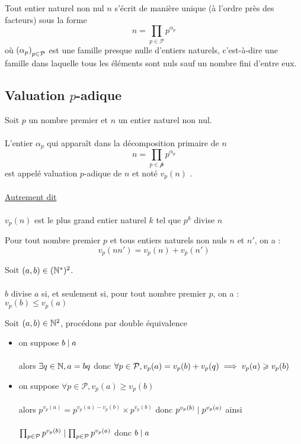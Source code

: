 \begin{defprop}[Corrolaire]
	Tout entier naturel non nul \(n\) s’écrit de manière unique (à l’ordre près des facteurs) sous la forme
	\[n = \prod_{p \in \mathcal{P}}p^{\alpha_p}\]
	où \(\left(\alpha_p\right)_{p \in \mathcal{P}}\) est une famille presque nulle d’entiers naturels, c’est-à-dire une famille dans laquelle tous les éléments sont nuls sauf un nombre fini d’entre eux.
\end{defprop}

\subsection{Valuation \(p\)-adique}
\begin{defprop}
	Soit \(p\) un nombre premier et \(n\) un entier naturel non nul.\\~\\
	L’entier \(\alpha_p\) qui apparaît dans la décomposition primaire de \(n\)
	\[n = \prod_{p \in \mathcal{p}} p ^{\alpha_p}\]
	est appelé valuation \(p\)-adique de \(n\) et noté \(v_p(n)\) .\\~\\
	\underline{Autrement dit}\\~\\
	\(v_p(n)\) est le plus grand entier naturel \(k\) tel que \(p^k\) divise \(n\)
\end{defprop}

\begin{defprop}
	Pour tout nombre premier \(p\) et tous entiers naturels non nuls \(n\) et \(n'\), on a :
	\[v_p(nn') = v_p(n) + v_p(n')\]
\end{defprop}

\begin{defprop}
	Soit \((a, b) \in (\mathbb{N}^*)^2\).\\~\\
	\(b\) divise \(a\) si, et seulement si, pour tout nombre premier \(p\), on a : \(v_p(b) \leq v_p(a)\)
\end{defprop}

\begin{dem}
	Soit \((a,b) \in \mathbb{N}^2\), procédons par double équivalence
	\begin{itemize}
		\item \impdir on suppose \(b\mid a\)\\~\\
		      alors \(\exists q \in \mathbb{N}, a = bq\) donc \(\forall p \in \mathcal{P}, v_p(a) = v_p(b) + v_p(q) \implies v_p(a) \geqslant v_p(b)\)
		\item \imprec on suppose \(\forall p \in \mathcal{P}, v_p(a) \geq v_p(b)\)\\~\\
		      alors \(p^{v_p(a)} = p^{v_p(a) - v_p(b)} \times p^{v_p(b)}\) donc \(p^{v_p(b)} \mid p^{v_p(a)}\) ainsi\\~\\
		      \(\prod_{p \in \mathcal{P}}p^{v_p(b)} \mid \prod_{p \in \mathcal{P}}p^{v_p(a)}\) donc \(b \mid a\)
	\end{itemize}
\end{dem}

